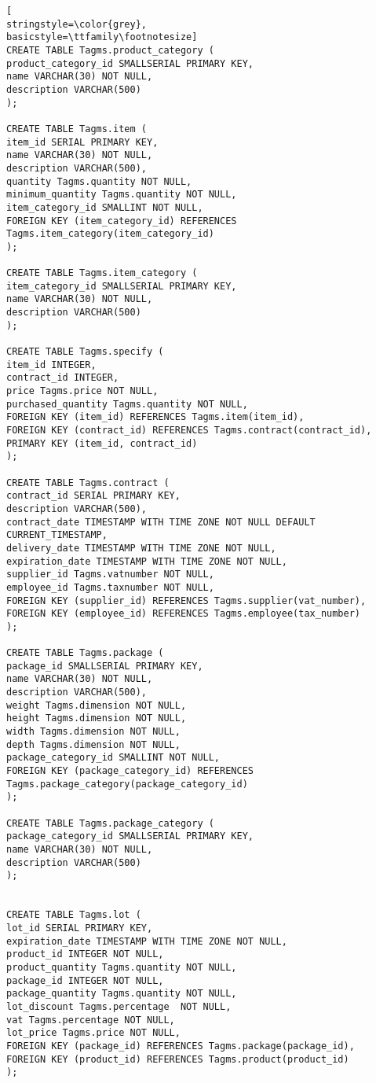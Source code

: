 \begin{lstlisting}[
stringstyle=\color{grey},
basicstyle=\ttfamily\footnotesize]
CREATE TABLE Tagms.product_category (
product_category_id SMALLSERIAL PRIMARY KEY,
name VARCHAR(30) NOT NULL,
description VARCHAR(500)
);

CREATE TABLE Tagms.item (
item_id SERIAL PRIMARY KEY,
name VARCHAR(30) NOT NULL,
description VARCHAR(500),
quantity Tagms.quantity NOT NULL,
minimum_quantity Tagms.quantity NOT NULL,
item_category_id SMALLINT NOT NULL,
FOREIGN KEY (item_category_id) REFERENCES Tagms.item_category(item_category_id)
);

CREATE TABLE Tagms.item_category (
item_category_id SMALLSERIAL PRIMARY KEY,
name VARCHAR(30) NOT NULL,
description VARCHAR(500)
);

CREATE TABLE Tagms.specify (
item_id INTEGER,
contract_id INTEGER,
price Tagms.price NOT NULL,
purchased_quantity Tagms.quantity NOT NULL,
FOREIGN KEY (item_id) REFERENCES Tagms.item(item_id),
FOREIGN KEY (contract_id) REFERENCES Tagms.contract(contract_id),
PRIMARY KEY (item_id, contract_id)
);

CREATE TABLE Tagms.contract (
contract_id SERIAL PRIMARY KEY,
description VARCHAR(500),
contract_date TIMESTAMP WITH TIME ZONE NOT NULL DEFAULT CURRENT_TIMESTAMP,
delivery_date TIMESTAMP WITH TIME ZONE NOT NULL,
expiration_date TIMESTAMP WITH TIME ZONE NOT NULL,
supplier_id Tagms.vatnumber NOT NULL,
employee_id Tagms.taxnumber NOT NULL,
FOREIGN KEY (supplier_id) REFERENCES Tagms.supplier(vat_number),
FOREIGN KEY (employee_id) REFERENCES Tagms.employee(tax_number)
);

CREATE TABLE Tagms.package (
package_id SMALLSERIAL PRIMARY KEY,
name VARCHAR(30) NOT NULL,
description VARCHAR(500),
weight Tagms.dimension NOT NULL,
height Tagms.dimension NOT NULL,
width Tagms.dimension NOT NULL,
depth Tagms.dimension NOT NULL,
package_category_id SMALLINT NOT NULL,
FOREIGN KEY (package_category_id) REFERENCES Tagms.package_category(package_category_id)
);

CREATE TABLE Tagms.package_category (
package_category_id SMALLSERIAL PRIMARY KEY,
name VARCHAR(30) NOT NULL,
description VARCHAR(500)
);


CREATE TABLE Tagms.lot (
lot_id SERIAL PRIMARY KEY,
expiration_date TIMESTAMP WITH TIME ZONE NOT NULL,
product_id INTEGER NOT NULL,
product_quantity Tagms.quantity NOT NULL,
package_id INTEGER NOT NULL,
package_quantity Tagms.quantity NOT NULL,
lot_discount Tagms.percentage  NOT NULL,
vat Tagms.percentage NOT NULL,
lot_price Tagms.price NOT NULL,
FOREIGN KEY (package_id) REFERENCES Tagms.package(package_id),
FOREIGN KEY (product_id) REFERENCES Tagms.product(product_id)
);



\end{lstlisting}
